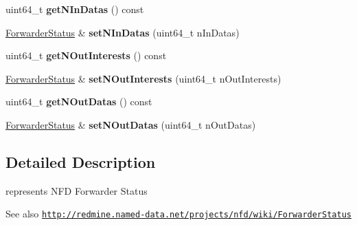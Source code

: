 \begin{DoxyCompactItemize}
\item 
uint64\+\_\+t {\bfseries get\+N\+In\+Datas} () const\hypertarget{classndn_1_1nfd_1_1ForwarderStatus_a42c1817c5376b914163e02943106bab5}{}\label{classndn_1_1nfd_1_1ForwarderStatus_a42c1817c5376b914163e02943106bab5}

\item 
\hyperlink{classndn_1_1nfd_1_1ForwarderStatus}{Forwarder\+Status} \& {\bfseries set\+N\+In\+Datas} (uint64\+\_\+t n\+In\+Datas)\hypertarget{classndn_1_1nfd_1_1ForwarderStatus_a0fc87290dcb6d90e9e8ce625899362f8}{}\label{classndn_1_1nfd_1_1ForwarderStatus_a0fc87290dcb6d90e9e8ce625899362f8}

\item 
uint64\+\_\+t {\bfseries get\+N\+Out\+Interests} () const\hypertarget{classndn_1_1nfd_1_1ForwarderStatus_a7139ac436ee14683fbeaadc01ad51fc1}{}\label{classndn_1_1nfd_1_1ForwarderStatus_a7139ac436ee14683fbeaadc01ad51fc1}

\item 
\hyperlink{classndn_1_1nfd_1_1ForwarderStatus}{Forwarder\+Status} \& {\bfseries set\+N\+Out\+Interests} (uint64\+\_\+t n\+Out\+Interests)\hypertarget{classndn_1_1nfd_1_1ForwarderStatus_a83df3f90858bac8a033717f7923ab2f9}{}\label{classndn_1_1nfd_1_1ForwarderStatus_a83df3f90858bac8a033717f7923ab2f9}

\item 
uint64\+\_\+t {\bfseries get\+N\+Out\+Datas} () const\hypertarget{classndn_1_1nfd_1_1ForwarderStatus_ad2f584545caee4073d497bc78de4b43c}{}\label{classndn_1_1nfd_1_1ForwarderStatus_ad2f584545caee4073d497bc78de4b43c}

\item 
\hyperlink{classndn_1_1nfd_1_1ForwarderStatus}{Forwarder\+Status} \& {\bfseries set\+N\+Out\+Datas} (uint64\+\_\+t n\+Out\+Datas)\hypertarget{classndn_1_1nfd_1_1ForwarderStatus_ab642da7a9e2499265b7d154d88dfb820}{}\label{classndn_1_1nfd_1_1ForwarderStatus_ab642da7a9e2499265b7d154d88dfb820}

\end{DoxyCompactItemize}


\subsection{Detailed Description}
represents N\+FD Forwarder Status 

\begin{DoxySeeAlso}{See also}
\href{http://redmine.named-data.net/projects/nfd/wiki/ForwarderStatus}{\tt http\+://redmine.\+named-\/data.\+net/projects/nfd/wiki/\+Forwarder\+Status} 
\end{DoxySeeAlso}


